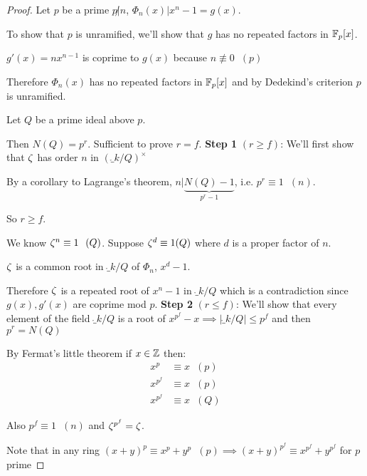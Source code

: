 \documentclass[11pt]{article}
\begin{document}
\begin{proof}
	\spa

	Let $p$ be a prime $p \not | n $, $\Phi_n(x) | x^n - 1 = g(x) $.
\spa

	To show that $p$ is unramified, we'll show that $g$ has no repeated factors in $\mathbb{F}_p[x]$.
\spa

	$g'(x) = nx^{n-1} $ is coprime to $g(x)$ because $n \not \equiv 0 \hspace{7pt}  (p)$
\spa

	Therefore $\Phi_n(x) $ has no repeated factors in $\mathbb{F}_p[x]$ and by Dedekind's criterion $p$ is unramified.
	\spa

	Let $Q$ be a prime ideal above $p$. 

	Then $N(Q) = p^r$. 
	Sufficient to prove $r=f$.
\spac
	\textbf{Step 1} $(r\geq f)$: We'll first show that $\zeta$ has order $n$ in $(\ring_k/Q)^\times$

	By a corollary to Lagrange's theorem, $n | \underbrace{N(Q) - 1}_{p^r -1 }$, i.e. $p^r \equiv 1 \hspace{7pt} (n) $. 
	\spa

	So $r\geq f$.
	\spa

	We know $\zeta^n \equiv 1 \hspace{7pt} (Q) $. 
	Suppose $\zeta^d \equiv 1 (Q)$ where $d$ is a proper factor of $n$. 
\spa

	$\zeta $ is a common root in $\ring_k / Q$ of $\Phi_n$, $x^d -1$.
	\spa

	Therefore $\zeta$ is a repeated root of $x^n - 1$ in $\ring_k / Q$ which is a contradiction since $g(x), g'(x)$ are coprime mod $p$.
	\spac
	\textbf{Step 2} $(r \leq f)$: We'll show that every element of the field $\ring_k /Q$ is a root of $x^{p^f} - x  \implies |\ring_k / Q| \leq p^f$ and then $p^r = N(Q)$
\spa

By Fermat's little theorem if $x \in \mathbb{Z}$ then:
	\begin{align*}
		x^p &\equiv x \hspace{7pt} (p)\\
		x^{p^f} &\equiv x \hspace{7pt} (p)\\
		x^{p^f} &\equiv x \hspace{7pt} (Q)
	\end{align*}

	Also $p^f \equiv 1 \hspace{7pt} (n)$ and $\zeta^{p^f} = \zeta$.
\spa

	Note that in any ring $(x+y)^p \equiv x^p + y^p \hspace{7pt} (p) \implies (x+y)^{p^f} \equiv x^{p^f} + y^{p^f}$ for $p$ prime
\spa


\end{proof}
\end{document}
